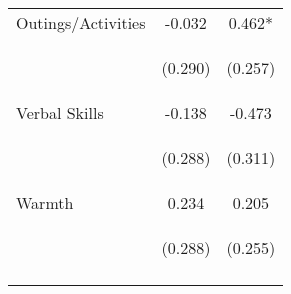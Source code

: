 \begin{tabular}{lcc}
\noalign{\smallskip}Outings/Activities & -0.032 & 0.462*\\
 & \begin{footnotesize}(0.290)\end{footnotesize} & \begin{footnotesize}(0.257)\end{footnotesize}\\
\noalign{\smallskip}Verbal Skills & -0.138 & -0.473\\
 & \begin{footnotesize}(0.288)\end{footnotesize} & \begin{footnotesize}(0.311)\end{footnotesize}\\
\noalign{\smallskip}Warmth & 0.234 & 0.205\\
 & \begin{footnotesize}(0.288)\end{footnotesize} & \begin{footnotesize}(0.255)\end{footnotesize}\\
\noalign{\smallskip}\hline\end{tabular}\\
